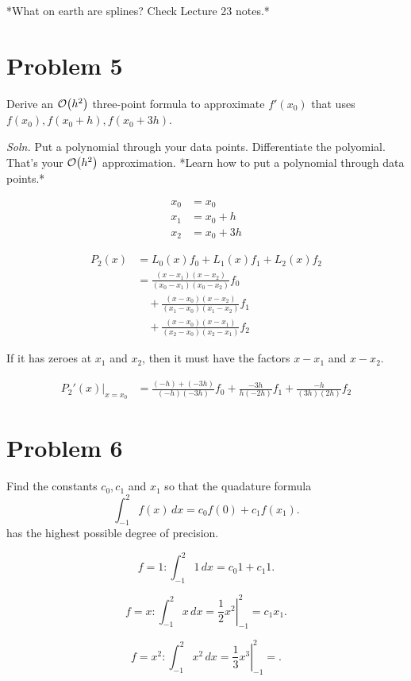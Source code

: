 \documentclass[12pt]{article}
\newcommand{\soln}{\textit{Soln.}\xspace}
\begin{document}
*What on earth are splines? Check Lecture 23 notes.*

\section{Problem 5}

Derive an $\order{h^2}$ three-point formula to approximate $f'(x_0)$ that uses
$f(x_0), f(x_0+h), f(x_0+3h)$.

\soln Put a polynomial through your data points. Differentiate the polyomial.
That's your $\order{h^2}$ approximation. *Learn how to put a polynomial through
data points.*

\begin{align*}
  x_0 &= x_0 \\
  x_1 &= x_0 + h \\
  x_2 &= x_0 + 3h 
\end{align*}

\begin{align*}
  P_2(x) &= L_0(x) f_0 + L_1(x) f_1 + L_2(x) f_2 \\
         &= \frac{(x-x_1)(x-x_2)}{(x_0-x_1)(x_0-x_2)} f_0 \\
         &\quad + \frac{(x-x_0)(x-x_2)}{(x_1-x_0)(x_1-x_2)} f_1 \\
         &\quad + \frac{(x-x_0)(x-x_1)}{(x_2-x_0)(x_2-x_1)} f_2
\end{align*}

If it has zeroes at $x_1$ and $x_2$, then it must have the factors $x-x_1$ and
$x-x_2$.

\begin{align*}
  \left.P_2'(x)\right|_{x=x_0} &= \frac{(-h)+(-3h)}{(-h)(-3h)}f_0 
    + \frac{-3h}{h(-2h)}f_1 
    + \frac{-h}{(3h)(2h)}f_2
\end{align*}

\section{Problem 6}

Find the constants $c_0, c_1$ and $x_1$ so that the quadature formula 
\[
  \int_{-1}^{2} f(x) \, dx = c_0 f(0) + c_1 f(x_1)
.\]
has the highest possible degree of precision.

\[
f=1: \int_{-1}^{2} 1 \, dx = c_0 1 + c_1 1
.\]

\[
  f=x: \int_{-1}^{2} x \, dx = \left.\frac{1}{2}x^2\right|_{-1}^2 = c_1 x_1
.\]

\[
f=x^2: \int_{-1}^{2} x^2 \, dx = \left.\frac{1}{3}x^3\right|_{-1}^2 =
.\]
\end{document}
